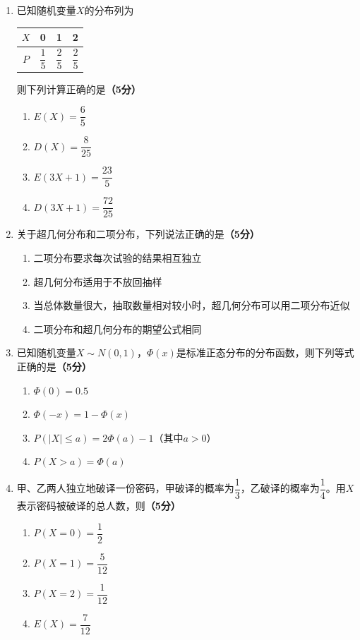 \documentclass[12pt, a4paper]{ctexart}
\newcommand{\score}[1]{\hfill\textbf{（#1分）}}
\begin{document}
\begin{enumerate}[label=\textbf{\arabic*.}, leftmargin=2em, resume]

\item 已知随机变量$X$的分布列为

\begin{center}
\begin{tabular}{|c|c|c|c|}
\hline
$X$ & 0 & 1 & 2 \\
\hline
$P$ & $\dfrac{1}{5}$ & $\dfrac{2}{5}$ & $\dfrac{2}{5}$ \\
\hline
\end{tabular}
\end{center}

则下列计算正确的是\score{5}
\begin{enumerate}[label=\Alph*., leftmargin=2em]
\item $E(X) = \dfrac{6}{5}$
\item $D(X) = \dfrac{8}{25}$
\item $E(3X+1) = \dfrac{23}{5}$
\item $D(3X+1) = \dfrac{72}{25}$
\end{enumerate}

\item 关于超几何分布和二项分布，下列说法正确的是\score{5}
\begin{enumerate}[label=\Alph*., leftmargin=2em]
\item 二项分布要求每次试验的结果相互独立
\item 超几何分布适用于不放回抽样
\item 当总体数量很大，抽取数量相对较小时，超几何分布可以用二项分布近似
\item 二项分布和超几何分布的期望公式相同
\end{enumerate}

\item 已知随机变量$X \sim N(0, 1)$，$\Phi(x)$是标准正态分布的分布函数，则下列等式正确的是\score{5}
\begin{enumerate}[label=\Alph*., leftmargin=2em]
\item $\Phi(0) = 0.5$
\item $\Phi(-x) = 1 - \Phi(x)$
\item $P(|X| \leqslant a) = 2\Phi(a) - 1$（其中$a > 0$）
\item $P(X > a) = \Phi(a)$
\end{enumerate}

\item 甲、乙两人独立地破译一份密码，甲破译的概率为$\dfrac{1}{3}$，乙破译的概率为$\dfrac{1}{4}$。用$X$表示密码被破译的总人数，则\score{5}
\begin{enumerate}[label=\Alph*., leftmargin=2em]
\item $P(X=0) = \dfrac{1}{2}$
\item $P(X=1) = \dfrac{5}{12}$
\item $P(X=2) = \dfrac{1}{12}$
\item $E(X) = \dfrac{7}{12}$
\end{enumerate}

\end{enumerate}
\end{document}
